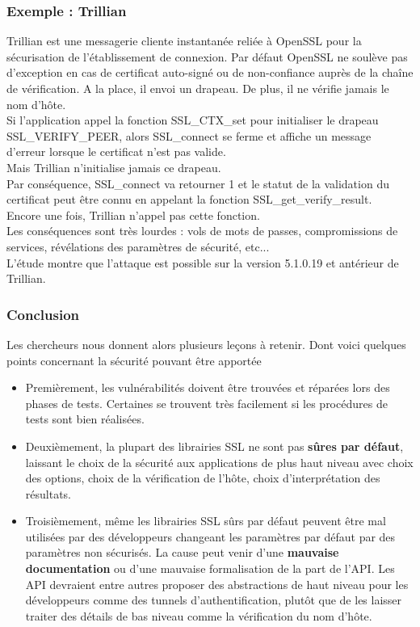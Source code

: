 		\subsubsection{Exemple : Trillian}

			Trillian est une messagerie cliente instantanée	reliée à OpenSSL pour la sécurisation de l'établissement de connexion. Par défaut OpenSSL ne soulève pas d'exception en cas de certificat auto-signé ou de non-confiance auprès de la chaîne de vérification. A la place, il envoi un drapeau. De plus, il ne vérifie jamais le nom d'hôte.\\
			
			Si l'application appel la fonction SSL\_CTX\_set pour initialiser le drapeau SSL\_VERIFY\_PEER, alors SSL\_connect se ferme et affiche un message d'erreur lorsque le certificat n'est pas valide.\\
			Mais Trillian n'initialise jamais ce drapeau.\\
			Par conséquence, SSL\_connect va retourner 1 et le statut de la validation du certificat peut être connu en appelant la fonction SSL\_get\_verify\_result.\\
			Encore une fois, Trillian n'appel pas cette fonction.\\

			Les conséquences sont très lourdes : vols de mots de passes, compromissions de services, révélations des paramètres de sécurité, etc...\\

			L'étude montre que l'attaque est possible sur la version 5.1.0.19 et antérieur de Trillian.

		\subsubsection{Conclusion}

			Les chercheurs nous donnent alors plusieurs leçons à retenir. Dont voici quelques points concernant la sécurité pouvant être apportée\\ 
			\begin{itemize}
			\item Premièrement, les vulnérabilités doivent être trouvées et réparées lors des phases de tests. Certaines se trouvent très facilement si les procédures de tests sont bien réalisées. 
			\item Deuxièmement, la plupart des librairies SSL ne sont pas \textbf{sûres par défaut}, laissant le choix de la sécurité aux applications de plus haut niveau avec choix des options, choix de la vérification de l'hôte, choix d'interprétation des résultats.
			\item Troisièmement, même les librairies SSL sûrs par défaut peuvent être mal utilisées par des développeurs changeant les paramètres par défaut par des paramètres non sécurisés. La cause peut venir d'une \textbf{mauvaise documentation} ou d'une mauvaise formalisation de la part de l'API. Les API devraient entre autres proposer des abstractions de haut niveau pour les développeurs comme des tunnels d'authentification, plutôt que de les laisser traiter des détails de bas niveau comme la vérification du nom d'hôte.\\
			\end{itemize}

